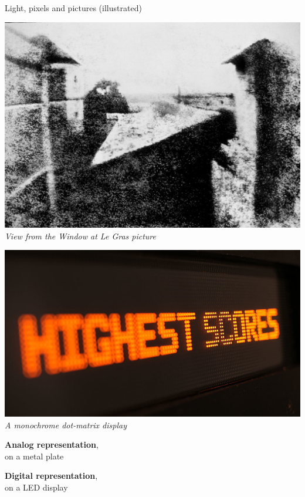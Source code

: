 \begin{frame}{Light, pixels and pictures (illustrated)}
  \begin{minipage}[b]{0.45\textwidth}
    \centering
    \includegraphics[width=\textwidth]{slides/graphics-introduction/first-photo.jpg}
    \textit{\small View from the Window at Le Gras picture}
  \end{minipage}
  \hfill
  \begin{minipage}[b]{0.45\textwidth}
    \centering
    \includegraphics[width=\textwidth]{slides/graphics-introduction/dot-matrix-display.jpg}
    \textit{\small A monochrome dot-matrix display}
  \end{minipage}

  \vspace{1em}

  \begin{minipage}[b]{0.45\textwidth}
    \centering
    \textbf{Analog representation},\\ on a metal plate
  \end{minipage}
  \hfill
  \begin{minipage}[b]{0.45\textwidth}
    \centering
    \textbf{Digital representation},\\ on a LED display
  \end{minipage}
\end{frame}

